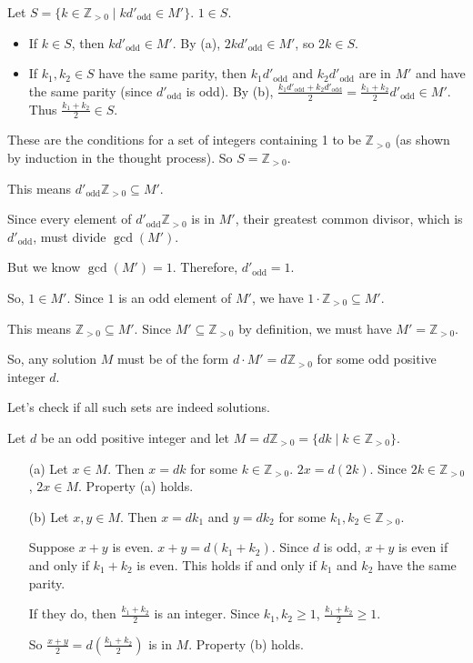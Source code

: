 \documentclass[12pt,a4paper]{article}
\theoremstyle{definition}
\begin{document}
        Let $S = \{k \in \mathbb{Z}_{>0} \mid k d'_{\text{odd}} \in M'\}$. $1 \in S$.
        \begin{itemize}
            \item If $k \in S$, then $k d'_{\text{odd}} \in M'$. By (a), $2k d'_{\text{odd}} \in M'$, so $2k \in S$.
            \item If $k_1, k_2 \in S$ have the same parity, then $k_1 d'_{\text{odd}}$ and $k_2 d'_{\text{odd}}$ are in $M'$ and have the same parity (since $d'_{\text{odd}}$ is odd). By (b), $\frac{k_1 d'_{\text{odd}} + k_2 d'_{\text{odd}}}{2} = \frac{k_1+k_2}{2}d'_{\text{odd}} \in M'$. Thus $\frac{k_1+k_2}{2} \in S$.
        \end{itemize}

        These are the conditions for a set of integers containing 1 to be $\mathbb{Z}_{>0}$ (as shown by induction in the thought process). So $S = \mathbb{Z}_{>0}$.

        This means $d'_{\text{odd}}\mathbb{Z}_{>0} \subseteq M'$.

        Since every element of $d'_{\text{odd}}\mathbb{Z}_{>0}$ is in $M'$, their greatest common divisor, which is $d'_{\text{odd}}$, must divide $\gcd(M')$.

        But we know $\gcd(M')=1$. Therefore, $d'_{\text{odd}}=1$.

        So, $1 \in M'$. Since $1$ is an odd element of $M'$, we have $1 \cdot \mathbb{Z}_{>0} \subseteq M'$.

        This means $\mathbb{Z}_{>0} \subseteq M'$. Since $M' \subseteq \mathbb{Z}_{>0}$ by definition, we must have $M' = \mathbb{Z}_{>0}$.

        So, any solution $M$ must be of the form $d \cdot M' = d\mathbb{Z}_{>0}$ for some odd positive integer $d$.

        Let's check if all such sets are indeed solutions.

        Let $d$ be an odd positive integer and let $M = d\mathbb{Z}_{>0} = \{dk \mid k \in \mathbb{Z}_{>0}\}$.
        \begin{enumerate}
            \item[(a)] Let $x \in M$. Then $x=dk$ for some $k \in \mathbb{Z}_{>0}$. $2x = d(2k)$. Since $2k \in \mathbb{Z}_{>0}$, $2x \in M$. Property (a) holds.
            \item[(b)] Let $x,y \in M$. Then $x=dk_1$ and $y=dk_2$ for some $k_1,k_2 \in \mathbb{Z}_{>0}$.

            Suppose $x+y$ is even. $x+y=d(k_1+k_2)$. Since $d$ is odd, $x+y$ is even if and only if $k_1+k_2$ is even. This holds if and only if $k_1$ and $k_2$ have the same parity.

            If they do, then $\frac{k_1+k_2}{2}$ is an integer. Since $k_1,k_2 \geq 1$, $\frac{k_1+k_2}{2} \geq 1$.

            So $\frac{x+y}{2} = d\left(\frac{k_1+k_2}{2}\right)$ is in $M$. Property (b) holds.
        \end{enumerate}
\end{document}
